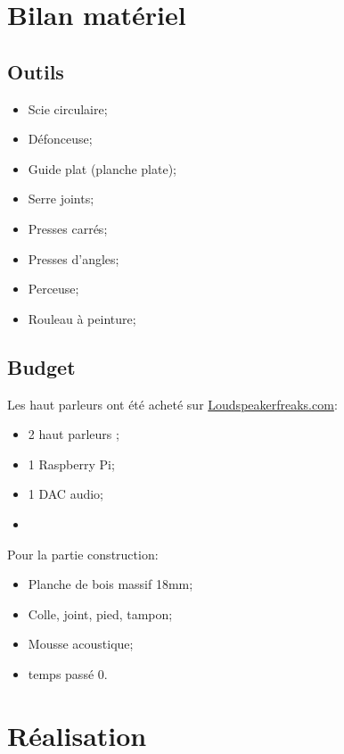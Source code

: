 \documentclass[a4paper,english]{report}
\begin{document}
			\chapter{Bilan matériel}
			\section{Outils}
			\begin{itemize}
				\item Scie circulaire;
				\item Défonceuse;
				\item Guide plat (planche plate);
				\item Serre joints;
				\item Presses carrés;
				\item Presses d'angles;
				\item Perceuse;
				\item Rouleau à peinture;
			\end{itemize}
			
			\section{Budget}
			Les haut parleurs ont été acheté sur \href{http://loudspeakerfreaks.com/intro.asp}{Loudspeakerfreaks.com}:
			\begin{itemize}
				\item 2 haut parleurs \texteuro;
				\item 1 Raspberry Pi;
				\item 1 DAC audio;
				\item 
			\end{itemize}
			Pour la partie construction:
			\begin{itemize}
				\item Planche de bois massif 18mm;  
				\item Colle, joint, pied, tampon;
				\item Mousse acoustique;
				\item temps passé 0\texteuro.				
			\end{itemize}
			
			\chapter{Réalisation}
			
\end{document}
